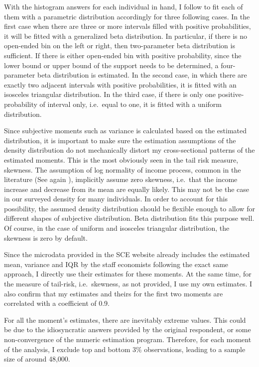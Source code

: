 \documentclass[12pt,notitlepage,onecolumn,aps,pra]{article}
\begin{document}
With the histogram answers for each individual in hand, I follow
\cite{engelberg_comparing_2009} to fit each of them with a parametric
distribution accordingly for three following cases. In the first case
when there are three or more intervals filled with positive
probabilities, it will be fitted with a generalized beta distribution.
In particular, if there is no open-ended bin on the left or right, then
two-parameter beta distribution is sufficient. If there is either
open-ended bin with positive probability, since the lower bound or upper
bound of the support needs to be determined, a four-parameter beta
distribution is estimated. In the second case, in which there are
exactly two adjacent intervals with positive probabilities, it is fitted
with an isosceles triangular distribution. In the third case, if there
is only one positive-probability of interval only, i.e.~equal to one, it
is fitted with a uniform distribution.

Since subjective moments such as variance is calculated based on the
estimated distribution, it is important to make sure the estimation
assumptions of the density distribution do not mechanically distort my
cross-sectional patterns of the estimated moments. This is the most
obviously seen in the tail risk measure, skewness. The assumption of log
normality of income process, common in the literature (See again
\cite{blundell_consumption_2008}), implicitly assume zero skewness,
i.e.~that the income increase and decrease from its mean are equally
likely. This may not be the case in our surveyed density for many
individuals. In order to account for this possibility, the assumed
density distribution should be flexible enough to allow for different
shapes of subjective distribution. Beta distribution fits this purpose
well. Of course, in the case of uniform and isosceles triangular
distribution, the skewness is zero by default.

Since the microdata provided in the SCE website already includes the
estimated mean, variance and IQR by the staff economists following the
exact same approach, I directly use their estimates for these moments.
At the same time, for the measure of tail-risk, i.e.~skewness, as not
provided, I use my own estimates. I also confirm that my estimates and
theirs for the first two moments are correlated with a coefficient of
0.9.

For all the moment's estimates, there are inevitably extreme values.
This could be due to the idiosyncratic answers provided by the original
respondent, or some non-convergence of the numeric estimation program.
Therefore, for each moment of the analysis, I exclude top and bottom
\(3\%\) observations, leading to a sample size of around 48,000.
\end{document}
